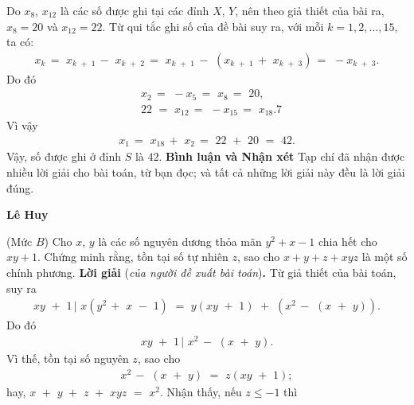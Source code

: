 \begin{multicols}{2}
	Do $x_8$, $x_{12}$ là các số được ghi tại các đỉnh $X$, $Y$, nên theo giả thiết của bài ra, $x_8 =20$  và  $x_{12} = 22$.
	\vskip 0.05cm
	Từ qui tắc ghi số của đề bài suy ra, với mỗi $k = 1, 2, \ldots, 15$, ta có:
	\begin{align*}
		{x_k}\, = \,\,{x_{k\,\, + \,\,1}}\, - \,\,{x_{k\,\, + \,\,2}}\, = \,\,{x_{k\,\, + \,\,1}}\, - \,\,\left( {{x_{k\,\, + \,\,1}}\, + \,\,{x_{k\,\, + \,\,3}}} \right)\, = \,\, - {x_{k\,\, + \,\,3}}.
	\end{align*}
	Do đó
		\begin{align*}
			&{x_2}\, = \,\, - {x_5}\, = \,\,{x_8}\, = \,\,20,\\
			&22\,\, = \,\,{x_{12}}\, = \,\, - {x_{15}}\, = \,\,{x_{18}}.7
		\end{align*}
	Vì vậy
	\begin{align*}
		{x_1}\, = \,\,{x_{18}}\, + \,\,{x_2}\, = \,\,22\,\, + \,\,20\,\, = \,\,42.
	\end{align*}
	Vậy, số được ghi ở đỉnh $S$ là $42$.
	\vskip 0.05cm
	\textbf{Bình luận và Nhận xét}
	\vskip 0.05cm	
	Tạp chí đã nhận được nhiều lời giải cho bài toán, từ bạn đọc; và tất cả những lời giải này đều là lời giải đúng.
	\begin{flushright}
		\textbf{Lê Huy}
	\end{flushright}
	{}
	(Mức $B$)
	Cho $x$, $y$ là các số nguyên dương thỏa mãn $y^2 + x - 1$ chia hết cho $xy + 1$. Chứng minh rằng, tồn tại số tự nhiên $z$, sao cho $x + y + z + xyz$ là một số chính phương.
	\vskip 0.05cm
	\textbf{Lời giải} (\textit{của người đề xuất bài toán})\textbf{.}
	\vskip 0.05cm
	Từ giả thiết của bài toán, suy ra
	\begin{align*}
		\left. {xy\,\, + \,\,1\,} \right|\,\,x\left( {{y^2}\, + \,\,x\,\, - \,\,1} \right)\,\, = \,\,y\left( {xy\,\, + \,\,1} \right)\,\, + \,\,\left( {{x^2}\, - \,\,\left( {x\,\, + \,\,y} \right)} \right).
	\end{align*}
	Do đó
	\begin{align*}
		\left. {xy\,\, + \,\,1\,} \right|\,\,{x^2}\, - \,\,\left( {x\,\, + \,\,y} \right).
	\end{align*}
	Vì thế, tồn tại số nguyên $z$, sao cho
	\begin{align*}
		{x^2}\, - \,\,\left( {x\,\, + \,\,y} \right)\,\, = \,\,z\left( {xy\,\, + \,\,1} \right);
	\end{align*}
	hay, $x\,\, + \,\,y\,\, + \,\,z\,\, + \,\,xyz\,\, = \,\,{x^2}.$
	\vskip 0.05cm  
	Nhận thấy, nếu $z \le -1$  thì
	\begin{align*}

\end{align*}
\end{multicols}
